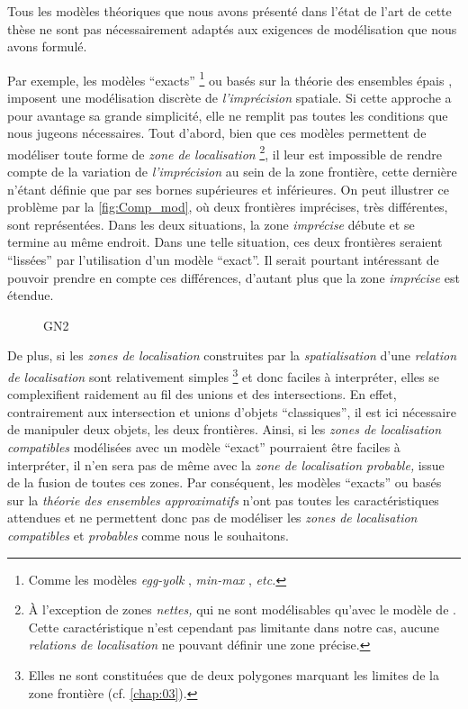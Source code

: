 Tous les modèles théoriques que nous avons présenté dans l'état de
l'art de cette thèse ne sont pas nécessairement adaptés aux exigences
de modélisation que nous avons formulé.

Par exemple, les modèles \enquote{exacts} \footnote{Comme les modèles
  \emph{egg-yolk} \autocite{Cohn1996}, \emph{min-max}
  \autocite{Clementini1996}, \emph{etc.}} ou basés sur la théorie des
ensembles épais \autocite{Pawlak1982}, imposent une modélisation
discrète de \emph{l'imprécision} spatiale. Si cette approche a pour
avantage sa grande simplicité, elle ne remplit pas toutes les
conditions que nous jugeons nécessaires. Tout d'abord, bien que ces
modèles permettent de modéliser toute forme de \emph{zone de
  localisation} \footnote{À l'exception de zones \emph{nettes,} qui ne
  sont modélisables qu'avec le modèle de \textcite{Bejaoui2009}. Cette
  caractéristique n'est cependant pas limitante dans notre cas, aucune
  \emph{relations de localisation} ne pouvant définir une zone
  précise.}, il leur est impossible de rendre compte de la variation
de \emph{l'imprécision} au sein de la zone frontière, cette dernière
n'étant définie que par ses bornes supérieures et inférieures. On peut
illustrer ce problème par la \autoref{fig:Comp_mod}, où deux
frontières imprécises, très différentes, sont représentées. Dans les
deux situations, la zone \emph{imprécise} débute et se termine au même
endroit. Dans une telle situation, ces deux frontières seraient
\enquote{lissées} par l'utilisation d'un modèle \enquote{exact}. Il
serait pourtant intéressant de pouvoir prendre en compte ces
différences, d'autant plus que la zone \emph{imprécise} est étendue.

\begin{figure}
  \centering
  
  \caption{GN2}
  \label{fig:Comp_mod}
\end{figure}

De plus, si les \emph{zones de localisation} construites par la
\emph{spatialisation} d'une \emph{relation de localisation} sont
relativement simples \footnote{Elles ne sont constituées que de deux
  polygones marquant les limites de la zone frontière
  (cf. \autoref{chap:03}).} et donc faciles à interpréter, elles se
complexifient raidement au fil des unions et des intersections. En
effet, contrairement aux intersection et unions d'objets
\enquote{classiques}, il est ici nécessaire de manipuler deux objets,
les deux frontières. Ainsi, si les \emph{zones de localisation
  compatibles} modélisées avec un modèle \enquote{exact} pourraient
être faciles à interpréter, il n'en sera pas de même avec la
\emph{zone de localisation probable,} issue de la fusion de toutes ces
zones. Par conséquent, les modèles \enquote{exacts} ou basés sur la
\emph{théorie des ensembles approximatifs} n'ont pas toutes les
caractéristiques attendues et ne permettent donc pas de modéliser les
\emph{zones de localisation compatibles} et \emph{probables} comme
nous le souhaitons.

